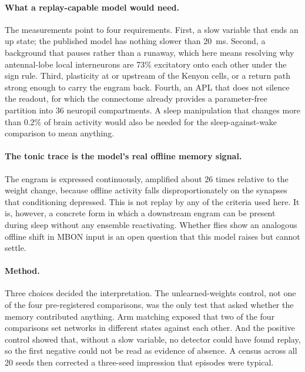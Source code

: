 \documentclass[11pt]{article}
\begin{document}
\paragraph{What a replay-capable model would need.} The measurements point to four requirements. First, a slow variable that ends an up state; the published model has nothing slower than 20~ms. Second, a background that pauses rather than a runaway, which here means resolving why antennal-lobe local interneurons are 73\% excitatory onto each other under the sign rule. Third, plasticity at or upstream of the Kenyon cells, or a return path strong enough to carry the engram back. Fourth, an APL that does not silence the readout, for which the connectome already provides a parameter-free partition into 36 neuropil compartments. A sleep manipulation that changes more than 0.2\% of brain activity would also be needed for the sleep-against-wake comparison to mean anything.

\paragraph{The tonic trace is the model's real offline memory signal.} The engram is expressed continuously, amplified about 26 times relative to the weight change, because offline activity falls disproportionately on the synapses that conditioning depressed. This is not replay by any of the criteria used here. It is, however, a concrete form in which a downstream engram can be present during sleep without any ensemble reactivating. Whether flies show an analogous offline shift in MBON input is an open question that this model raises but cannot settle.

\paragraph{Method.} Three choices decided the interpretation. The unlearned-weights control, not one of the four pre-registered comparisons, was the only test that asked whether the memory contributed anything. Arm matching exposed that two of the four comparisons set networks in different states against each other. And the positive control showed that, without a slow variable, no detector could have found replay, so the first negative could not be read as evidence of absence. A census across all 20 seeds then corrected a three-seed impression that episodes were typical.
\end{document}
